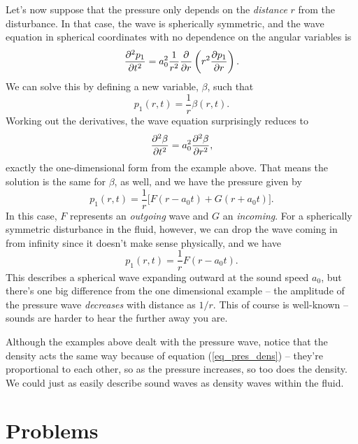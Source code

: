 \begin{example}
Let's now suppose that the pressure only depends on the \emph{distance} $r$ from the disturbance.  In that case, the wave is spherically symmetric, and the wave equation in spherical coordinates with no dependence on the angular variables is
\begin{equation}
\frac{\partial^2 {p_1}}{\partial {t}^2} = a_0^2 \frac{1}{r^2} \frac{\partial {}}{\partial {r}} \left( r^2 \frac{\partial {p_1}}{\partial {r}} \right).
\end{equation}
We can solve this by defining a new variable, $\beta$, such that
\[
p_1(r, t) = \frac{1}{r} \beta(r, t).
\]
Working out the derivatives, the wave equation surprisingly reduces to 
\[
\frac{\partial^2 {\beta}}{\partial {t}^2} = a_0^2 \frac{\partial^2 {\beta}}{\partial {r}^2},
\]
exactly the one-dimensional form from the example above.  That means the solution is the same for $\beta$, as well, and we have the pressure given by
\[
p_1(r, t) = \frac{1}{r} \bigl[ F(r - a_0t) + G(r + a_0t) \bigr].
\]
In this case, $F$ represents an \emph{outgoing} wave and $G$ an \emph{incoming}.  For a spherically symmetric disturbance in the fluid, however, we can drop the wave coming in from infinity since it doesn't make sense physically, and we have
\begin{equation}
p_1 (r, t) = \frac{1}{r} F(r - a_0 t).
\end{equation}
This describes a spherical wave expanding outward at the sound speed $a_0$, but there's one big difference from the one dimensional example -- the amplitude of the pressure wave \emph{decreases} with distance as $1/r$.  This of course is well-known -- sounds are harder to hear the further away you are.
\end{example}

Although the examples above dealt with the pressure wave, notice that the density acts the same way because of equation (\ref{eq_pres_dens}) -- they're proportional to each other, so as the pressure increases, so too does the density.  We could just as easily describe sound waves as density waves within the fluid.





\section*{Problems}
%

